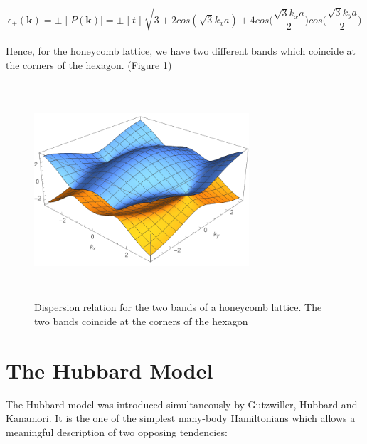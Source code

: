 \documentclass{article}
\begin{document}
\begin{equation}
\epsilon_{\pm}(\textbf{k}) = \pm \mid P(\textbf{k}) \mid = \pm \mid t \mid \sqrt{3 + 2 cos(\sqrt{3}k_x a) + 4 cos\Big(\frac{\sqrt{3}k_x a}{2} \Big) cos \Big(\frac{\sqrt{3}k_y a}{2} \Big)   }
\end{equation}
\\
Hence, for the honeycomb lattice, we have two different bands which coincide at the corners of the hexagon. (Figure \ref{fig:hc})
\begin{figure}[H]
\centering
\includegraphics[height=8cm, width = 8cm, keepaspectratio]{hc.pdf}
\caption{Dispersion relation for the two bands of a honeycomb lattice. The two bands coincide at the corners of the hexagon}
\label{fig:hc}
\end{figure}

\section{The Hubbard Model}
The Hubbard model was introduced simultaneously by Gutzwiller, Hubbard and Kanamori. It is the one of the simplest many-body Hamiltonians which allows a meaningful description of two opposing tendencies:
\end{document}
